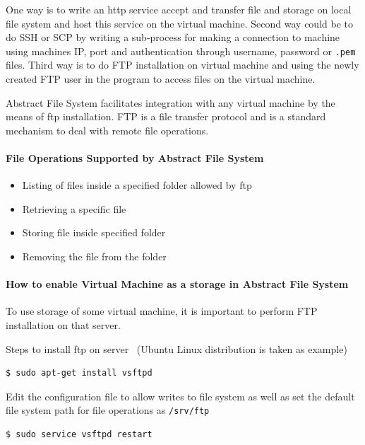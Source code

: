 One way is to write an http service accept and transfer file and storage on 
local file system and host this service on the virtual machine. Second way 
could be to do SSH or SCP by writing a sub-process for making a connection to 
machine using machines IP, port and authentication through username, 
password or \verb|.pem| files. Third way is to do FTP installation on virtual 
machine and using the newly created FTP user in the program to access files on 
the virtual machine.


Abstract File System facilitates integration with any virtual machine by the 
means of ftp installation. FTP is a file transfer protocol and is a standard 
mechanism to deal with remote file operations.


\paragraph{File Operations Supported by Abstract File System }
\begin{itemize}
    \item  Listing of files inside a specified folder allowed by ftp
    \item  Retrieving a specific file 
    \item  Storing file inside specified folder
    \item  Removing the file from the folder
\end{itemize}   

\paragraph{How to enable Virtual Machine as a storage in Abstract File System}

To use storage of some virtual machine, it is important to perform 
FTP installation on that server. 

Steps to install ftp on server~\cite{hid-sp18-420-FTP}
(Ubuntu Linux distribution is taken as example)


\begin{verbatim}
$ sudo apt-get install vsftpd
\end{verbatim}

Edit the configuration file to allow writes to file system as well as set the 
default file system path for file operations as \verb|/srv/ftp|

\begin{verbatim}
$ sudo service vsftpd restart
\end{verbatim}



